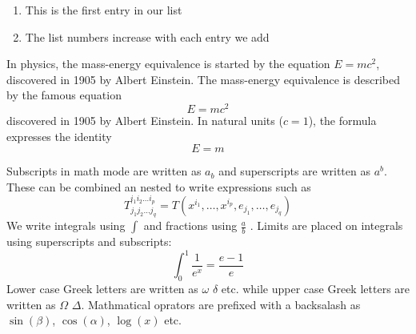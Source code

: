 \documentclass{article}
\begin{document}
\begin{enumerate}
	\item This is the first entry in our list
	\item The list numbers increase with each entry we add
\end{enumerate}
	In physics, the mass-energy equivalence is started by 
the equation $E=mc^2$, discovered in 1905 by Albert Einstein.
The mass-energy equivalence is described by the famous equation
\[E=mc^2\]
discovered in 1905 by Albert Einstein. 
In natural units ($c=1$), the formula expresses the identity
\[E=m\]

Subscripts in math mode are written as $a_b$ and superscripts are written as $a^b$. These can be combined an nested to write expressions such as
\[T^{i_1 i_2 \dots i_p}_{j_1 j_2 \dots j_q}=
T(x^{i_1},\dots,x^{i_p},e_{j_1},\dots,e_{j_q})\]
We write integrals using $\int$ and fractions using $\frac{a}{b}$
. Limits are placed on integrals using superscripts and subscripts:
\[\int_0^1 \frac{1}{e^x}=\frac{e-1}{e}\]
Lower case Greek letters are written as $\omega$ $\delta$ etc. while upper case Greek letters are written as $\Omega$ $\Delta$.
Mathmatical oprators are prefixed with a backsalash as $\sin(\beta)$, $\cos(\alpha)$, $\log(x)$ etc.
\end{document}
